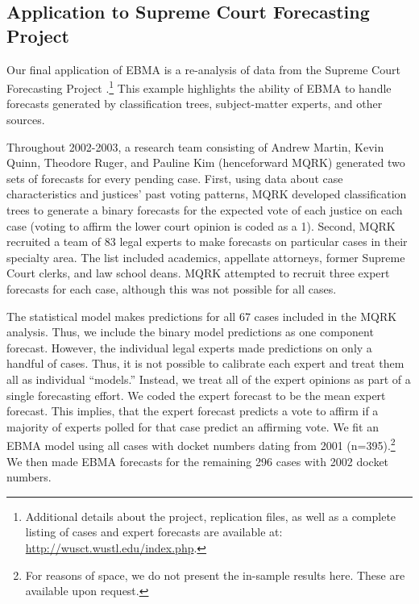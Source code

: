 \documentclass[pdftex,12pt,fullpage,oneside]{amsart}
\begin{document}

\subsection{Application to Supreme Court Forecasting Project}

Our final application of EBMA is a re-analysis of data from the
Supreme Court Forecasting Project \citep{Ruger:2004,
  Martin:2004}.\footnote{Additional details about the project,
  replication files, as well as a complete listing of cases and expert
  forecasts are available at: \url{http://wusct.wustl.edu/index.php}.}
This example highlights the ability of EBMA to handle forecasts
generated by classification trees, subject-matter experts, and other sources.

Throughout 2002-2003, a research team consisting of Andrew
Martin, Kevin Quinn, Theodore Ruger, and Pauline Kim (henceforward
MQRK) generated two sets of forecasts for every pending case.  First,
using data about case characteristics and justices' past voting
patterns, MQRK developed classification trees to generate a binary
forecasts for the expected vote of each justice on each case (voting
to affirm the lower court opinion is coded as a 1).  Second, MQRK
recruited a team of 83 legal experts to make forecasts on particular
cases in their specialty area.  The list included academics, appellate
attorneys, former Supreme Court clerks, and law school deans.  MQRK
attempted to recruit three expert forecasts for each case, although
this was not possible for all cases.

The statistical model makes predictions for all 67 cases included in
the MQRK analysis.  Thus, we include the binary model predictions as
one component forecast. However, the individual legal experts made
predictions on only a handful of cases.  Thus, it is not possible to
calibrate each expert and treat them all as individual ``models.''
Instead, we treat all of the expert opinions as part of a single
forecasting effort.  We coded the expert forecast to be the mean
expert forecast. This implies, that the expert forecast predicts a
vote to affirm if a majority of experts polled for that case predict
an affirming vote.  We fit an EBMA model using all cases with docket
numbers dating from 2001 (n=395).\footnote{For reasons of space, we do
  not present the in-sample results here.  These are available upon
  request.}  We then made EBMA forecasts for the remaining 296 cases
with 2002 docket numbers.
\end{document}
